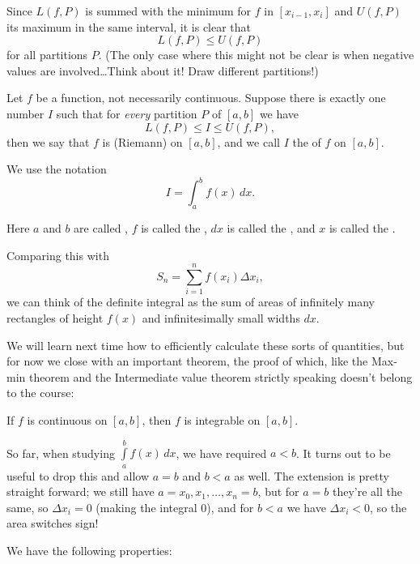 \noindent
Since $L(f, P)$ is summed with the minimum for $f$ in $[x_{i - 1}, x_i]$ and $U(f, P)$ its maximum in the same interval, it is clear that
\[
	L(f, P) \leq U(f, P)
\]
for all partitions $P$.
(The only case where this might not be clear is when negative values are involved\ldots Think about it!
Draw different partitions!)

\begin{definition}
	Let $f$ be a function, not necessarily continuous.
	Suppose there is exactly one number $I$ such that for \emph{every} partition $P$ of $[a, b]$ we have
	\[
		L(f, P) \leq I \leq U(f, P),
	\]
	then we say that $f$ is (Riemann)  on $[a, b]$, and we call $I$ the  of $f$ on $[a, b]$.

	We use the notation
	\[
		I = \int_a^b f(x) \, d x.
	\]

	\noindent
	Here $a$ and $b$ are called , $f$ is called the , $d x$ is called the , and $x$ is called the .
\end{definition}

\noindent
Comparing this with
\[
	S_n = \sum_{i = 1}^n f(x_i) \Delta x_i,
\]
we can think of the definite integral as the sum of areas of infinitely many rectangles of height $f(x)$ and infinitesimally small widths $d x$.

We will learn next time how to efficiently calculate these sorts of quantities, but for now we close with an important theorem, the proof of which, like the Max-min theorem and the Intermediate value theorem strictly speaking doesn't belong to the course:

\begin{theorem}
	If $f$ is continuous on $[a, b]$, then $f$ is integrable on $[a, b]$.
\end{theorem}

\noindent
So far, when studying $\int\limits_a^b f(x) \, d x$, we have required $a < b$.
It turns out to be useful to drop this and allow $a = b$ and $b < a$ as well. The extension is pretty straight forward; we still have $a = x_0, x_1, \ldots, x_n = b$, but for $a = b$ they're all the same, so $\Delta x_i = 0$ (making the integral $0$), and for $b < a$ we have $\Delta x_i < 0$, so the area switches sign!

We have the following properties:

